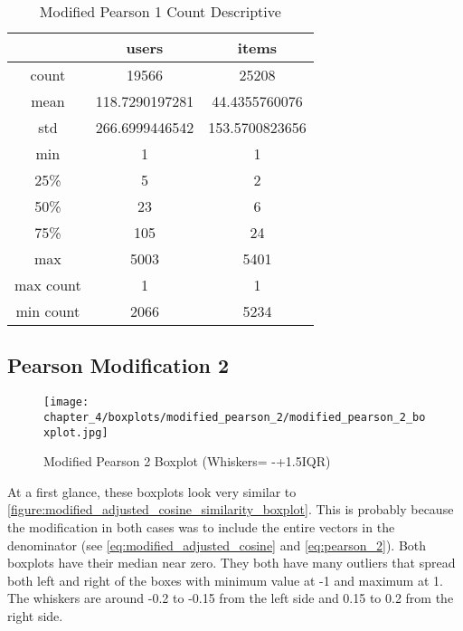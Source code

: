 \begin{table}[H]
\centering
\caption{Modified Pearson 1 Count Descriptive}
\label{modified_pearson_1_count_descriptive}
\begin{tabular}{|c|c|c|}
\hline
          & \textbf{users} & \textbf{items} \\ \hline
count     & 19566          & 25208          \\ \hline
mean      & 118.7290197281 & 44.4355760076  \\ \hline
std       & 266.6999446542 & 153.5700823656 \\ \hline
min       & 1              & 1              \\ \hline
25\%      & 5              & 2              \\ \hline
50\%      & 23             & 6              \\ \hline
75\%      & 105            & 24             \\ \hline
max       & 5003           & 5401           \\ \hline
max count & 1              & 1              \\ \hline
min count & 2066           & 5234           \\ \hline
\end{tabular}
\end{table}


\subsection{Pearson Modification 2}
\begin{figure}[H]
\centering
\texttt{[image: chapter\_4/boxplots/modified\_pearson\_2/modified\_pearson\_2\_boxplot.jpg]}
\caption{Modified Pearson 2 Boxplot (Whiskers= -+1.5IQR)}
\label{figure:modified_pearson_2_boxplot}
\end{figure}

At a first glance, these boxplots look very similar to \autoref{figure:modified_adjusted_cosine_similarity_boxplot}.
This is probably because the modification in both cases was to include the entire vectors in the
denominator (see \autoref{eq:modified_adjusted_cosine} and \autoref{eq:pearson_2}). Both boxplots have
their median near zero. They both have many outliers that spread both left and right of the boxes with
minimum value at -1 and maximum at 1. The whiskers are around -0.2 to -0.15 from the left
side and 0.15 to 0.2 from the right side.

